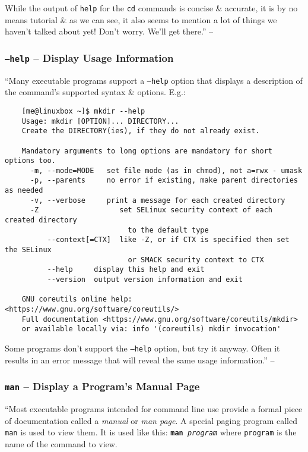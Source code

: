 \documentclass[oneside]{book}
\numberwithin{equation}{section}
\begin{document}
While the output of \texttt{help} for the \texttt{cd} commands is concise \& accurate, it is by no means tutorial \& as we can see, it also seems to mention a lot of things we haven't talked about yet! Don't worry. We'll get there.'' -- \cite[pp. 85--87]{Shotts2019}

\subsubsection{\texttt{--help} -- Display Usage Information}
``Many executable programs support a \texttt{--help} option that displays a description of the command's supported syntax \& options. E.g.:
\begin{verbatim}
	[me@linuxbox ~]$ mkdir --help
	Usage: mkdir [OPTION]... DIRECTORY...
	Create the DIRECTORY(ies), if they do not already exist.
	
	Mandatory arguments to long options are mandatory for short options too.
	  -m, --mode=MODE   set file mode (as in chmod), not a=rwx - umask
	  -p, --parents     no error if existing, make parent directories as needed
	  -v, --verbose     print a message for each created directory
	  -Z                   set SELinux security context of each created directory
	                         to the default type
	      --context[=CTX]  like -Z, or if CTX is specified then set the SELinux
	                         or SMACK security context to CTX
	      --help     display this help and exit
	      --version  output version information and exit
	
	GNU coreutils online help: <https://www.gnu.org/software/coreutils/>
	Full documentation <https://www.gnu.org/software/coreutils/mkdir>
	or available locally via: info '(coreutils) mkdir invocation'
\end{verbatim}
Some programs don't support the \texttt{--help} option, but try it anyway. Often it results in an error message that will reveal the same usage information.'' -- \cite[p. 87]{Shotts2019}

\subsubsection{\texttt{man} -- Display a Program's Manual Page}
``Most executable programs intended for command line use provide a formal piece of documentation called a \textit{manual} or \textit{man page}. A special paging program called \texttt{man} is used to view them. It is used like this: \texttt{\textbf{man} \textit{program}} where \texttt{program} is the name of the command to view.
\end{document}
